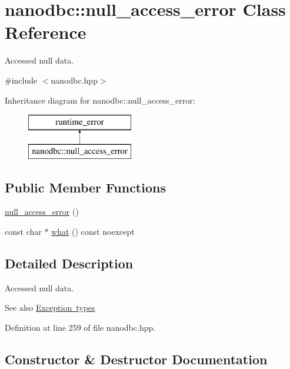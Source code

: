 \hypertarget{classnanodbc_1_1null__access__error}{}\section{nanodbc\+::null\+\_\+access\+\_\+error Class Reference}
\label{classnanodbc_1_1null__access__error}


Accessed null data.  




{\ttfamily \#include $<$nanodbc.\+hpp$>$}

Inheritance diagram for nanodbc\+::null\+\_\+access\+\_\+error\+:\begin{figure}[H]
\begin{center}
\leavevmode
\includegraphics[height=2.000000cm]{classnanodbc_1_1null__access__error}
\end{center}
\end{figure}
\subsection*{Public Member Functions}
\begin{DoxyCompactItemize}
\item 
\mbox{\hyperlink{classnanodbc_1_1null__access__error_a266596c19b36563938c415a19fdd67ad}{null\+\_\+access\+\_\+error}} ()
\item 
const char $\ast$ \mbox{\hyperlink{classnanodbc_1_1null__access__error_a59f79b8c5a6aec646e7b4e75b6c94624}{what}} () const noexcept
\end{DoxyCompactItemize}


\subsection{Detailed Description}
Accessed null data. 

\begin{DoxySeeAlso}{See also}
\mbox{\hyperlink{group__exceptions}{Exception types}} 
\end{DoxySeeAlso}


Definition at line 259 of file nanodbc.\+hpp.



\subsection{Constructor \& Destructor Documentation}
\mbox{\label{classnanodbc_1_1null__access__error_a266596c19b36563938c415a19fdd67ad}} 
